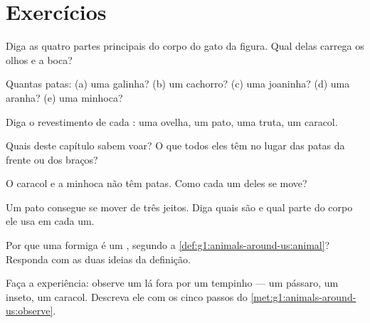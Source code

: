 \section{Exercícios}

\begin{exercise}[$\star$]\label{exo:g1:animals-around-us:1}
Diga as quatro partes principais do corpo do gato da figura. Qual
delas carrega os olhos e a boca?
\end{exercise}

\begin{exercise}[$\star$]\label{exo:g1:animals-around-us:2}
Quantas patas: (a) uma galinha? (b) um cachorro? (c) uma joaninha?
(d) uma aranha? (e) uma minhoca?
\end{exercise}

\begin{exercise}[$\star$]\label{exo:g1:animals-around-us:3}
Diga o revestimento de cada : uma ovelha, um pato, uma truta,
um caracol.
\end{exercise}

\begin{exercise}[$\star$]\label{exo:g1:animals-around-us:4}
Quais  deste capítulo sabem voar? O que todos eles têm no
lugar das patas da frente ou dos braços?
\end{exercise}

\begin{exercise}[$\star$]\label{exo:g1:animals-around-us:5}
O caracol e a minhoca não têm patas. Como cada um deles se move?
\end{exercise}

\begin{exercise}[$\star$]\label{exo:g1:animals-around-us:6}
Um pato consegue se mover de três jeitos. Diga quais são e qual
parte do corpo ele usa em cada um.
\end{exercise}

\begin{exercise}[$\star$]\label{exo:g1:animals-around-us:7}
Por que uma formiga é um , segundo a
\cref{def:g1:animals-around-us:animal}? Responda com as duas ideias
da definição.
\end{exercise}

\begin{exercise}[$\star$]\label{exo:g1:animals-around-us:8}
Faça a experiência: observe um  lá fora por um tempinho ---
um pássaro, um inseto, um caracol. Descreva ele com os cinco passos
do \cref{met:g1:animals-around-us:observe}.
\end{exercise}

